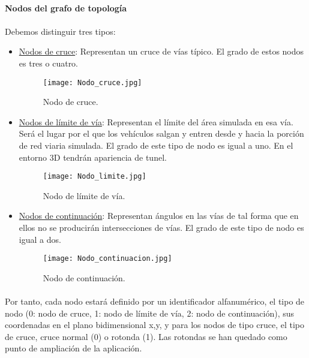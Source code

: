	\paragraph{Nodos del grafo de topología}
	
	\paragraph{}
	Debemos distinguir tres tipos:
	\begin{itemize}
		\item \underline{Nodos de cruce}: Representan un cruce de vías típico. El grado de estos nodos es tres o cuatro.
		
		\begin{figure}[H]
			\centering
				\texttt{[image: Nodo\_cruce.jpg]}
		\caption{Nodo de cruce.}
		\label{fig:IntersectionNodeSchematic}
		\end{figure}
	
		\item \underline{Nodos de límite de vía}: Representan el límite del área simulada en esa vía. Será el lugar por el que los vehículos salgan y entren desde y hacia la porción de red viaria simulada. El grado de este tipo de nodo es igual a uno. En el entorno 3D tendrán apariencia de tunel.
		
		\begin{figure}[H]
			\centering
				\texttt{[image: Nodo\_limite.jpg]}
		\caption{Nodo de límite de vía.}
		\label{fig:LimitNodeSchematic}
		\end{figure}
\newpage
		\item \underline{Nodos de continuación}: Representan ángulos en las vías de tal forma que en ellos no se producirán intersecciones de vías. El grado de este tipo de nodo es igual a dos.
		
		\begin{figure}[H]
			\centering
				\texttt{[image: Nodo\_continuacion.jpg]}
		\caption{Nodo de continuación.}
		\label{fig:ContinuationNodeSchematic}
		\end{figure}
	
	\end{itemize}
	
	\paragraph{}
	Por tanto, cada nodo estará definido por un identificador alfanumérico, el tipo de nodo (0: nodo de cruce, 1: nodo de límite de vía, 2: nodo de continuación), sus coordenadas en el plano bidimensional x,y, y para los nodos de tipo cruce, el tipo de cruce, cruce normal (0) o rotonda (1). Las rotondas se han quedado como punto de ampliación de la aplicación.

